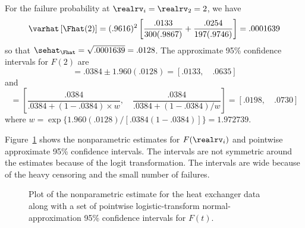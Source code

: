 \begin{example}
For the failure probability at $\realrv_{i}=\realrv_{2}=2$, we have
\begin{displaymath}
\varhat \left [\Fhat(2) \right ]
=(.9616)^{2} \left[ \frac{.0133}{300(.9867)}+
\frac{.0254}{197(.9746)} \right] = .0001639
\end{displaymath}
so that $\sehat_{\Fhat} = \sqrt{.0001639}=.0128$.
The approximate 95\% confidence intervals for $F(2)$ are
\begin{displaymath}
[\undertilde{F}(2), \quad \tilde{F}(2)] 
= .0384 \pm 1.960(.0128)=[.0133, \quad .0635]
\end{displaymath}
and
\begin{displaymath}
[\undertilde{F}(2), \quad \tilde{F}(2)] = 
\left[\frac{.0384}{.0384
+(1-.0384) \times w}, \quad \frac{.0384}{.0384+
(1-.0384)/w}\right] = \left[.0198, \quad .0730\right]
\end{displaymath}
where $w=\exp\{1.960(.0128)/[.0384(1-.0384)]\}=1.972739$.

Figure~\ref{figure:heatexch.cdf.pw.ps} shows the nonparametric
estimates for $F(\realrv_{i})$ and pointwise approximate 95\%
confidence intervals.  The intervals are not symmetric around the
estimates because of the logit transformation. The intervals are wide
because of the heavy censoring and the small number of failures.
\begin{figure}
\caption{Plot of the nonparametric estimate
for the heat exchanger data along with a set of pointwise
logistic-transform normal-approximation 95\% confidence intervals for
$F(t)$.}
\label{figure:heatexch.cdf.pw.ps}
\end{figure}
\end{example}


